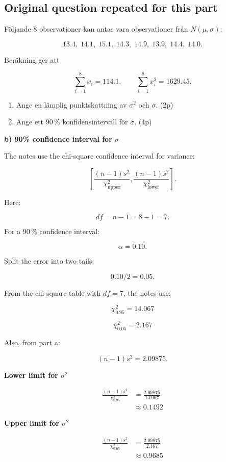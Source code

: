 \documentclass[10pt]{article}
\begin{document}
\subsection*{Original question repeated for this part}
Följande 8 observationer kan antas vara observationer från
$N(\mu,\sigma)$:

\[
13.4,\;14.1,\;15.1,\;14.3,\;14.9,\;13.9,\;14.4,\;14.0.
\]

Beräkning ger att

\[
\sum_{i=1}^{8} x_i=114.1,
\qquad
\sum_{i=1}^{8} x_i^2=1629.45.
\]

\begin{enumerate}[label=\alph*)]
\item
Ange en lämplig punktskattning av $\sigma^2$ och $\sigma$.
\hfill (2p)

\item
Ange ett $90\,\%$ konfidensintervall för $\sigma$.
\hfill (4p)
\end{enumerate}

\textbf{b) 90\% confidence interval for $\sigma$}

The notes use the chi-square confidence interval for variance:

\[
\left[
\frac{(n-1)s^2}{\chi^2_{\text{upper}}},
\frac{(n-1)s^2}{\chi^2_{\text{lower}}}
\right].
\]

Here:

\[
df=n-1=8-1=7.
\]

For a $90\,\%$ confidence interval:

\[
\alpha=0.10.
\]

Split the error into two tails:

\[
0.10/2=0.05.
\]

From the chi-square table with $df=7$, the notes use:

\[
\chi^2_{0.95}=14.067
\]

\[
\chi^2_{0.05}=2.167
\]

Also, from part a:

\[
(n-1)s^2=2.09875.
\]

\textbf{Lower limit for $\sigma^2$}

\begin{align*}
\frac{(n-1)s^2}{\chi^2_{0.95}}
&=
\frac{2.09875}{14.067} \\[2mm]
&\approx 0.1492
\end{align*}

\textbf{Upper limit for $\sigma^2$}

\begin{align*}
\frac{(n-1)s^2}{\chi^2_{0.05}}
&=
\frac{2.09875}{2.167} \\[2mm]
&\approx 0.9685
\end{align*}
\end{document}
